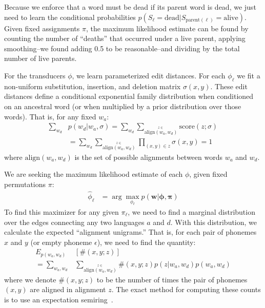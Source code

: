 \documentclass[11pt,a4paper]{article}
\begin{document}
Because we enforce that a word must be dead if its parent word is
dead, we just need to learn the conditional probabilities
$p(S_\ell=\mathrm{dead}| S_{\mathrm{parent}(\ell)}=\mathrm{alive})$.
Given fixed assignments $\pi$, the maximum likelihood estimate can
be found by counting the number of ``deaths'' that occurred under
a live parent, applying smoothing--we found adding 0.5 to be
reasonable--and dividing by the total number of live parents.

For the transducers $\phi$, we learn parameterized edit
distances. For each $\phi_\ell$ we fit a non-uniform substitution,
insertion, and deletion matrix $\sigma(x,y)$. These edit distances
define a conditional exponential family distribution when conditioned
on an ancestral word (or when multiplied by a prior distribution
over those words). That is, for any fixed $w_a$:
\begin{equation*}
  \begin{split}
    \sum_{w_d} &p(w_d|w_a,\sigma) = \sum_{w_d} \sum_{\stackrel{z\in}{\scriptscriptstyle\mathrm{align}(w_a,w_d)}} \mathrm{score}(z;\sigma) \\
    &= \sum_{w_d} \sum_{\stackrel{z\in}{\scriptscriptstyle\mathrm{align}(w_a,w_d)}} \prod_{(x,y)\in z} \sigma(x,y) = 1
   \end{split}
 \end{equation*}
where $\mathrm{align}(w_a,w_d)$ is the set of possible alignments between words $w_a$ and $w_d$.

We are seeking the maximum likelihood estimate of each $\phi$, given
fixed permutations $\pi$:
\begin{equation*}
  \begin{split}
    \hat\phi_{\ell} &= \arg\!\max_{\phi_{\ell}} p(\mathbf w|\mathbf \phi,\mathbf\pi)
   \end{split}
 \end{equation*}
To find this maximizer for any given $\pi_\ell$, we need to find a marginal
distribution over the edges connecting any two languages $a$ and
$d$. With this distribution, we calculate the expected ``alignment
unigrams.'' That is,  for each pair of phonemes $x$ and $y$ (or
empty phoneme $\epsilon$), we need to find the quantity:
\begin{equation*}
  \begin{split}
    E_{p(w_a,w_d)}&[\#(x,y;z)] \\ = \sum_{w_a,w_d} &\sum_{\stackrel{z\in}{\scriptscriptstyle\mathrm{align}(w_a,w_d)}} \#(x,y;z) p(z|w_a,w_d)p(w_a,w_d)
   \end{split}
 \end{equation*}
where we denote $\#(x,y;z)$ to be the number of times the pair of
phonemes $(x,y)$ are aligned in alignment $z$.  The exact method
for computing these counts is to use an expectation
semiring~\cite{eisner2001expectation}.
\end{document}
